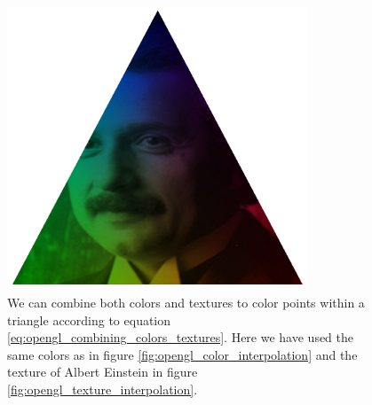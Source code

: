 \begin{figure}[h]
\begin{center}
\includegraphics[width=0.8\textwidth, trim=0cm 0cm 0cm 0cm, clip]{opengl/figures/color_and_texture.png}
\end{center}
\caption{We can combine both colors and textures to color points within a triangle according to equation \eqref{eq:opengl_combining_colors_textures}. Here we have used the same colors as in figure \ref{fig:opengl_color_interpolation} and the texture of Albert Einstein in figure \ref{fig:opengl_texture_interpolation}.}
\label{fig:color_and_texture}
\end{figure}


